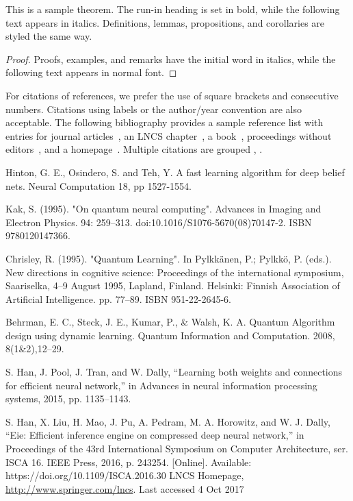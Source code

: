 \documentclass[runningheads]{llncs}
\begin{document}
\begin{theorem}
This is a sample theorem. The run-in heading is set in bold, while
the following text appears in italics. Definitions, lemmas,
propositions, and corollaries are styled the same way.
\end{theorem}
%
%
\begin{proof}
Proofs, examples, and remarks have the initial word in italics,
while the following text appears in normal font.
\end{proof}
For citations of references, we prefer the use of square brackets
and consecutive numbers. Citations using labels or the author/year
convention are also acceptable. The following bibliography provides
a sample reference list with entries for journal
articles~\cite{ref_article1}, an LNCS chapter~\cite{ref_lncs1}, a
book~\cite{ref_book1}, proceedings without editors~\cite{ref_proc1},
and a homepage~\cite{ref_url1}. Multiple citations are grouped
\cite{ref_article1,ref_lncs1,ref_book1},
\cite{ref_article1,ref_book1,ref_proc1,ref_url1}.
%
%
%
% 
% 
%
\begin{thebibliography}{8}
Hinton, G. E., Osindero, S. and Teh, Y.
A fast learning algorithm for deep belief nets.
Neural Computation 18, pp 1527-1554.

Kak, S. (1995). "On quantum neural computing". Advances in Imaging and Electron Physics. 94: 259–313. doi:10.1016/S1076-5670(08)70147-2. ISBN 9780120147366.

Chrisley, R. (1995). "Quantum Learning". In Pylkkänen, P.; Pylkkö, P. (eds.). New directions in cognitive science: Proceedings of the international symposium, Saariselka, 4–9 August 1995, Lapland, Finland. Helsinki: Finnish Association of Artificial Intelligence. pp. 77–89. ISBN 951-22-2645-6.

Behrman, E. C., Steck, J. E., Kumar, P., \& Walsh, K. A. Quantum Algorithm design using dynamic learning. Quantum Information and Computation. 2008, 8(1\&2),12–29.

S. Han, J. Pool, J. Tran, and W. Dally, “Learning both weights
and connections for efficient neural network,” in Advances in neural
information processing systems, 2015, pp. 1135–1143.

S. Han, X. Liu, H. Mao, J. Pu, A. Pedram, M. A. Horowitz, and
W. J. Dally, “Eie: Efficient inference engine on compressed deep
neural network,” in Proceedings of the 43rd International Symposium
on Computer Architecture, ser. ISCA 16. IEEE Press, 2016, p. 243254.
[Online]. Available: https://doi.org/10.1109/ISCA.2016.30
LNCS Homepage, \url{http://www.springer.com/lncs}. Last accessed 4
Oct 2017
\end{thebibliography}
\end{document}
